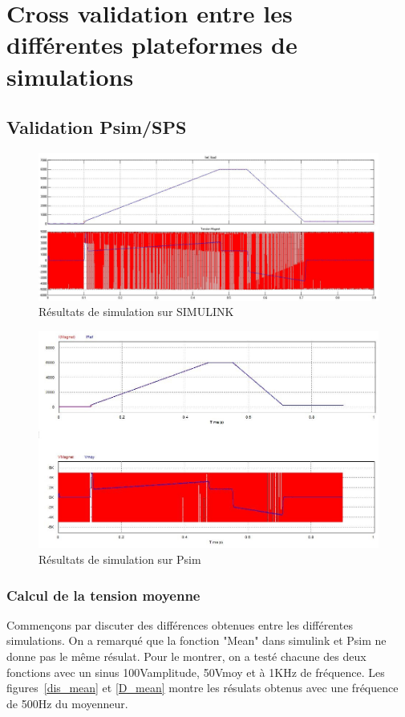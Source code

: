 \documentclass[11pt,letterpaper,final]{report}
\begin{document}
\chapter{Cross validation entre les différentes plateformes de simulations}
\section{Validation Psim/SPS}
\begin{figure}[ht]
\centering
\includegraphics[scale=0.5]{fig/resul_sim.jpg}
\caption{Résultats de simulation sur SIMULINK}
\end{figure}
\begin{figure}[ht]
\centering
\includegraphics[scale=0.6]{fig/resul_psim.jpg}
\caption{Résultats de simulation sur Psim}
\end{figure}
\subsection{Calcul de la tension moyenne}

Commençons par discuter des différences obtenues entre les différentes simulations. On a remarqué que la fonction "Mean" dans simulink et Psim ne donne pas le même résulat. Pour le montrer, on a testé chacune des deux fonctions avec un sinus 100Vamplitude, 50Vmoy et à 1KHz de fréquence. Les figures~\ref{dis_mean} et \ref{D_mean} montre les résulats obtenus avec une fréquence de 500Hz du moyenneur.
\end{document}
